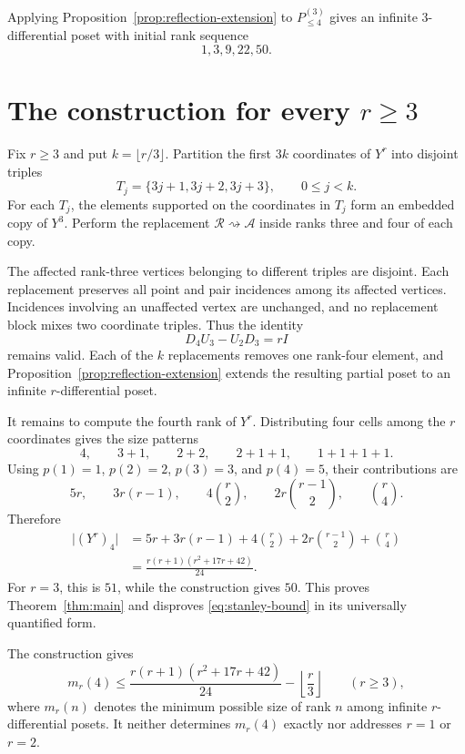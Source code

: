 \documentclass[11pt,a4paper]{amsart}
\theoremstyle{definition}
\theoremstyle{remark}
\newcommand{\card}[1]{\lvert #1\rvert}
\newcommand{\Rcal}{\mathcal{R}}
\newcommand{\Acal}{\mathcal{A}}
\begin{document}
Applying Proposition~\ref{prop:reflection-extension} to $P^{(3)}_{\leq4}$ gives an infinite $3$-differential poset with initial rank sequence
\[
  1,3,9,22,50.
\]

\section{The construction for every \texorpdfstring{$r\geq3$}{r >= 3}}\label{sec:general-r}

Fix $r\geq3$ and put $k=\lfloor r/3\rfloor$. Partition the first $3k$ coordinates of $Y^r$ into disjoint triples
\[
  T_j=\{3j+1,3j+2,3j+3\},
  \qquad 0\leq j<k.
\]
For each $T_j$, the elements supported on the coordinates in $T_j$ form an embedded copy of $Y^3$. Perform the replacement $\Rcal\rightsquigarrow\Acal$ inside ranks three and four of each copy.

The affected rank-three vertices belonging to different triples are disjoint. Each replacement preserves all point and pair incidences among its affected vertices. Incidences involving an unaffected vertex are unchanged, and no replacement block mixes two coordinate triples. Thus the identity
\[
  D_4U_3-U_2D_3=rI
\]
remains valid. Each of the $k$ replacements removes one rank-four element, and Proposition~\ref{prop:reflection-extension} extends the resulting partial poset to an infinite $r$-differential poset.

It remains to compute the fourth rank of $Y^r$. Distributing four cells among the $r$ coordinates gives the size patterns
\[
  4,\qquad3+1,\qquad2+2,\qquad2+1+1,\qquad1+1+1+1.
\]
Using $p(1)=1$, $p(2)=2$, $p(3)=3$, and $p(4)=5$, their contributions are
\[
  5r,\qquad3r(r-1),\qquad4\binom r2,\qquad
  2r\binom{r-1}{2},\qquad\binom r4.
\]
Therefore
\begin{align*}
  \card{(Y^r)_4}
  &=5r+3r(r-1)+4\binom r2+2r\binom{r-1}{2}+\binom r4\\
  &=\frac{r(r+1)(r^2+17r+42)}{24}.
\end{align*}
For $r=3$, this is $51$, while the construction gives $50$. This proves Theorem~\ref{thm:main} and disproves \eqref{eq:stanley-bound} in its universally quantified form.

The construction gives
\[
  m_r(4)\leq
  \frac{r(r+1)(r^2+17r+42)}{24}
  -\left\lfloor\frac r3\right\rfloor
  \qquad(r\geq3),
\]
where $m_r(n)$ denotes the minimum possible size of rank $n$ among infinite $r$-differential posets. It neither determines $m_r(4)$ exactly nor addresses $r=1$ or $r=2$.
\end{document}
